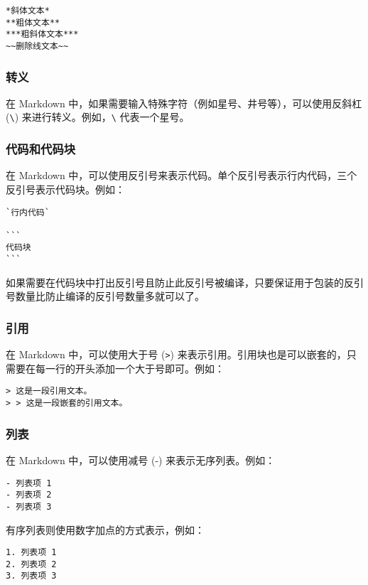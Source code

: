 \documentclass[../main.tex]{subfiles}
\begin{document}
\begin{verbatim}
*斜体文本*
**粗体文本**
***粗斜体文本***
~~删除线文本~~
\end{verbatim}

\subsubsection{转义}

在 Markdown 中，如果需要输入特殊字符（例如星号、井号等），可以使用反斜杠 (\texttt{\textbackslash}) 来进行转义。例如，\texttt{\textbackslash*} 代表一个星号。

\subsubsection{代码和代码块}

在 Markdown 中，可以使用反引号来表示代码。单个反引号表示行内代码，三个反引号表示代码块。例如：

\begin{verbatim}
`行内代码`

```
代码块
```
\end{verbatim}

如果需要在代码块中打出反引号且防止此反引号被编译，只要保证用于包装的反引号数量比防止编译的反引号数量多就可以了。

\subsubsection{引用}

在 Markdown 中，可以使用大于号 (\texttt{>}) 来表示引用。引用块也是可以嵌套的，只需要在每一行的开头添加一个大于号即可。例如：

\begin{verbatim}
> 这是一段引用文本。
> > 这是一段嵌套的引用文本。
\end{verbatim}

\subsubsection{列表}

在 Markdown 中，可以使用减号 (-) 来表示无序列表。例如：

\begin{verbatim}
- 列表项 1
- 列表项 2
- 列表项 3
\end{verbatim}

有序列表则使用数字加点的方式表示，例如：

\begin{verbatim}
1. 列表项 1
2. 列表项 2
3. 列表项 3
\end{verbatim}
\end{document}
